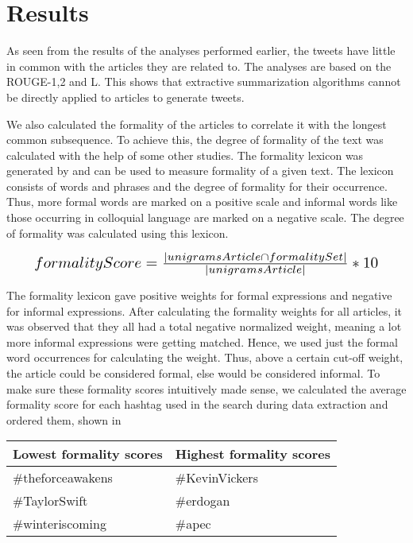 \section{Results}

As seen from the results of the analyses performed earlier, the tweets have little in common with the articles they are related to. The analyses are based on the ROUGE-1,2 and L. This shows that extractive summarization algorithms cannot be directly applied to articles to generate tweets. 

We also calculated the formality of the articles to correlate it with the longest common subsequence. To achieve this, the degree of formality of the text was calculated with the help of some other studies. The formality lexicon was generated by  and can be used to measure formality of a given text. The lexicon consists of words and phrases and the degree of formality for their occurrence. Thus, more formal words are marked on a positive scale and informal words like those occurring in colloquial language are marked on a negative scale. The degree of formality was calculated using this lexicon.

\begin{equation}
\resizebox{.9\hsize}{!}{$formalityScore = \frac{| unigramsArticle \cap formalitySet |}{| unigramsArticle |} * 10$}
\end{equation}

The formality lexicon gave positive weights for formal expressions and negative for informal expressions. After calculating the formality weights for all articles, it was observed that they all had a total negative normalized weight, meaning a lot more informal expressions were getting matched. Hence, we used just the formal word occurrences for calculating the weight. Thus, above a certain cut-off weight, the article could be considered formal, else would be considered informal. To make sure these formality scores intuitively made sense, we calculated the average formality score for each hashtag used in the search during data extraction and ordered them, shown in 


\begin{table}[h]
\begin{tabular}{l|l}
\hline
Lowest formality scores & Highest formality scores \\ \hline
\#theforceawakens       & \#KevinVickers           \\
\#TaylorSwift           & \#erdogan                \\
\#winteriscoming        & \#apec                  
\end{tabular}
\label{tab:formal}
\end{table}

